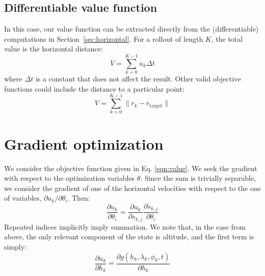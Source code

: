 \documentclass[11pt]{scrartcl} %
\begin{document}
\subsection{Differentiable value function}
In this case, our value function can be extracted directly from the (differentiable) computations in Section~\ref{sec:horizontal}. For a rollout of length $K$, the total value is the horizontal distance:
\begin{equation}
V = \sum_{k=0}^{K-1} u_k \Delta t\label{eqn:value}
\end{equation}
where $\Delta t$ is a constant that does not affect the result. Other valid objective functions could include the distance to a particular point:
\[V = \sum_{k=0}^{K-1} \lVert r_k - r_\text{target}\rVert\]

\section{Gradient optimization}
We consider the objective function given in Eq. \ref{eqn:value}. We seek the gradient with respect to the optimization variables $\theta$. Since the sum is trivially separable, we consider the gradient of one of the horizontal velocities with respect to the one of variables, $\partial u_k/\partial \theta_i$. Then:
\[\frac{\partial u_k}{\partial \theta_i} = \frac{\partial u_k}{\partial s_{k,j}}\frac{\partial s_{k,j}}{\partial \theta_i}\]
Repeated indices implicitly imply summation. We note that, in the case from above, the only relevant component of the state is altitude, and the first term is simply:
\[\frac{\partial u_k}{\partial h_k} = \frac{\partial g(h_k, \lambda_k, \phi_k, t)}{\partial h_k}\]
\end{document}
